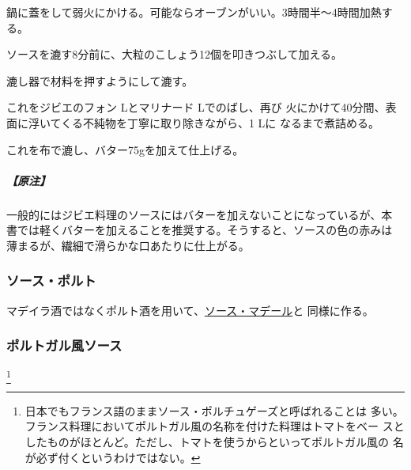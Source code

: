 \begin{recette}
鍋に蓋をして弱火にかける。可能ならオーブンがいい。3時間半〜4時間加熱す
る。

ソースを漉す8分前に、大粒のこしょう12個を叩きつぶして加える。

漉し器で材料を押すようにして漉す。

これをジビエのフォン\unquart{} Lとマリナード\unquart{} Lでのばし、再び
火にかけて40分間、表面に浮いてくる不純物を丁寧に取り除きながら、1 Lに
なるまで煮詰める。

これを布で漉し、バター75gを加えて仕上げる。

\hypertarget{sauce-poivrade-pour-gibier}{%
\subparagraph{【原注】}\label{sauce-poivrade-pour-gibier}}

一般的にはジビエ料理のソースにはバターを加えないことになっているが、本
書では軽くバターを加えることを推奨する。そうすると、ソースの色の赤みは
薄まるが、繊細で滑らかな口あたりに仕上がる。

\hypertarget{sauce-au-porto}{%
\subsubsection{ソース・ポルト}\label{sauce-au-porto}}



マデイラ酒ではなくポルト酒を用いて、\protect\hyperlink{sauce-madere}{ソース・マデール}と
同様に作る。

\hypertarget{sauce-portugaise}{%
\subsubsection{ポルトガル風ソース}\label{sauce-portugaise}}

\footnote{日本でもフランス語のままソース・ポルチュゲーズと呼ばれることは
  多い。フランス料理においてポルトガル風の名称を付けた料理はトマトをベー
  スとしたものがほとんど。ただし、トマトを使うからといってポルトガル風の
  名が必ず付くというわけではない。}



\end{recette}
